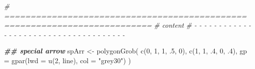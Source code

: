 \documentclass[
]{article}
\newenvironment{Shaded}{\begin{snugshade}}{\end{snugshade}}
\newcommand{\AttributeTok}[1]{\textcolor[rgb]{0.77,0.63,0.00}{#1}}
\newcommand{\CommentTok}[1]{\textcolor[rgb]{0.56,0.35,0.01}{\textit{#1}}}
\newcommand{\DecValTok}[1]{\textcolor[rgb]{0.00,0.00,0.81}{#1}}
\newcommand{\DocumentationTok}[1]{\textcolor[rgb]{0.56,0.35,0.01}{\textbf{\textit{#1}}}}
\newcommand{\FunctionTok}[1]{\textcolor[rgb]{0.00,0.00,0.00}{#1}}
\newcommand{\NormalTok}[1]{#1}
\newcommand{\OtherTok}[1]{\textcolor[rgb]{0.56,0.35,0.01}{#1}}
\newcommand{\StringTok}[1]{\textcolor[rgb]{0.31,0.60,0.02}{#1}}
\begin{document}
\begin{Shaded}
\begin{Highlighting}[]
\CommentTok{\# ==========================================================================}
\CommentTok{\# content}
\CommentTok{\# {-} {-} {-} {-} {-} {-} {-} {-} {-} {-} {-} {-} {-} {-} {-} {-} {-} {-} {-} {-} {-} {-} {-} {-} {-} {-} {-} {-} {-} {-} {-} {-} {-} {-} {-} {-} {-}}

\DocumentationTok{\#\# special arrow}
\NormalTok{spArr }\OtherTok{\textless{}{-}} \FunctionTok{polygonGrob}\NormalTok{(}
  \FunctionTok{c}\NormalTok{(}\DecValTok{0}\NormalTok{, }\DecValTok{1}\NormalTok{, }\DecValTok{1}\NormalTok{, .}\DecValTok{5}\NormalTok{, }\DecValTok{0}\NormalTok{), }\FunctionTok{c}\NormalTok{(}\DecValTok{1}\NormalTok{, }\DecValTok{1}\NormalTok{, .}\DecValTok{4}\NormalTok{, }\DecValTok{0}\NormalTok{, .}\DecValTok{4}\NormalTok{),}
  \AttributeTok{gp =} \FunctionTok{gpar}\NormalTok{(}\AttributeTok{lwd =} \FunctionTok{u}\NormalTok{(}\DecValTok{2}\NormalTok{, line), }\AttributeTok{col =} \StringTok{"grey30"}\NormalTok{)}
\NormalTok{)}


\end{Highlighting}
\end{Shaded}
\end{document}
